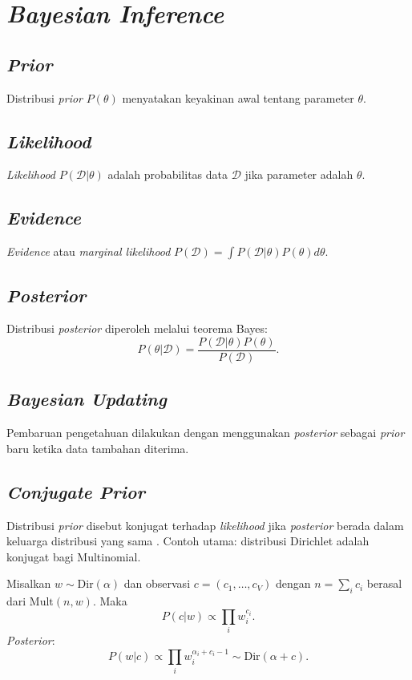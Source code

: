 \section{\textit{Bayesian Inference}}

\subsection{\textit{Prior}}
Distribusi \textit{prior} \(P(\theta)\) menyatakan keyakinan awal tentang parameter \(\theta\).

\subsection{\textit{Likelihood}}
\textit{Likelihood} \(P(\mathcal{D}|\theta)\) adalah probabilitas data \(\mathcal{D}\) jika parameter adalah \(\theta\).

\subsection{\textit{Evidence}}
\textit{Evidence} atau \textit{marginal likelihood} \(P(\mathcal{D}) = \int P(\mathcal{D}|\theta) P(\theta) d\theta\).

\subsection{\textit{Posterior}}
Distribusi \textit{posterior} diperoleh melalui teorema Bayes:
\begin{equation}
P(\theta|\mathcal{D}) = \frac{P(\mathcal{D}|\theta) P(\theta)}{P(\mathcal{D})}.
\end{equation}

\subsection{\textit{Bayesian Updating}}
Pembaruan pengetahuan dilakukan dengan menggunakan \textit{posterior} sebagai \textit{prior} baru ketika data tambahan diterima.

\subsection{\textit{Conjugate Prior}}
Distribusi \textit{prior} disebut konjugat terhadap \textit{likelihood} jika \textit{posterior} berada dalam keluarga distribusi yang sama \citep{moi}. Contoh utama: distribusi Dirichlet adalah konjugat bagi Multinomial.

Misalkan \(w \sim \text{Dir}(\alpha)\) dan observasi \(c = (c_1,\dots,c_V)\) dengan \(n = \sum_i c_i\) berasal dari \(\text{Mult}(n, w)\). Maka
\[
P(c|w) \propto \prod_i w_i^{c_i}.
\]
\textit{Posterior}:
\begin{equation}
P(w|c) \propto \prod_i w_i^{\alpha_i + c_i - 1} \sim \text{Dir}(\alpha + c).
\end{equation}


